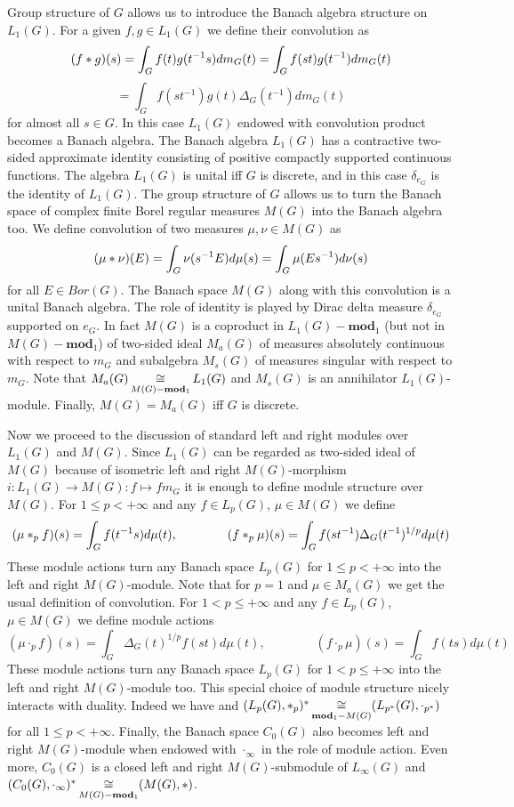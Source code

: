 Group structure of $G$ allows us to introduce the Banach algebra structure on $L_1(G)$. For a given $f,g\in L_1(G)$ we define their convolution as
$$
(f\ast g)(s)=\int_G f(t)g(t^{-1}s)dm_G(t)=\int_G f(st)g(t^{-1})dm_G(t)
$$
$$=\int_G f(st^{-1})g(t)\Delta_G(t^{-1})dm_G(t)
$$
for almost all $s\in G$. In this case $L_1(G)$ endowed with convolution product becomes a Banach algebra. The Banach algebra $L_1(G)$ has a contractive two-sided approximate identity consisting of positive compactly supported continuous functions. The algebra $L_1(G)$ is unital iff $G$ is discrete, and in this case $\delta_{e_G}$ is the identity of $L_1(G)$. The group structure of $G$ allows us to turn the Banach space of complex finite Borel regular measures $M(G)$ into the Banach algebra too. We define convolution of two measures $\mu,\nu\in M(G)$ as
$$
(\mu\ast \nu)(E)=\int_G\nu(s^{-1}E)d\mu(s)=\int_G\mu(Es^{-1})d\nu(s)
$$
for all $E\in Bor(G)$. The Banach space $M(G)$ along with this convolution is a unital Banach algebra. The role of identity is played by Dirac delta measure $\delta_{e_G}$ supported on $e_G$. In fact $M(G)$ is a coproduct in $L_1(G)-\mathbf{mod}_1$ (but not in $M(G)-\mathbf{mod}_1$) of two-sided ideal $M_a(G)$ of measures absolutely continuous with respect to $m_G$ and subalgebra $M_s(G)$ of measures singular with respect to $m_G$. Note that $M_a(G)\mathop{\mathbin{\cong}}\limits_{M(G)-\mathbf{mod}_1}L_1(G)$ and $M_s(G)$ is an annihilator $L_1(G)$-module. Finally, $M(G)=M_a(G)$ iff $G$ is discrete. 

Now we proceed to the discussion of standard left and right modules over $L_1(G)$ and $M(G)$. Since $L_1(G)$ can be regarded as two-sided ideal of $M(G)$ because of isometric left and right $M(G)$-morphism $i:L_1(G)\to M(G):f\mapsto f m_G$ it is enough to define module structure over $M(G)$. For $1\leq p<+\infty$ and any $f\in L_p(G)$, $\mu\in M(G)$ we define
$$
(\mu\ast_p f)(s)=\int_G f(t^{-1}s)d\mu(t),
\qquad\qquad
(f\ast_p \mu)(s)=\int_G f(st^{-1})\Delta_G(t^{-1})^{1/p}d\mu(t)
$$
These module actions turn any Banach space $L_p(G)$ for $1\leq p<+\infty$ into the left and right $M(G)$-module. Note that for $p=1$ and $\mu\in M_a(G)$ we get the usual definition of convolution. For $1<p\leq +\infty$ and any $f\in L_p(G)$, $\mu\in M(G)$ we define module actions
$$
(\mu\cdot_p f)(s)=\int_G \Delta_G(t)^{1/p}f(st)d\mu(t),
\qquad\qquad
(f\cdot_p \mu)(s)=\int_G f(ts)d\mu(t)
$$
These module actions turn any Banach space $L_p(G)$ for $1<p\leq+\infty$ into the left and right $M(G)$-module too. This special choice of module structure nicely interacts with duality. Indeed we have and $(L_p(G),\ast_p)^*\mathop{\mathbin{\cong}}\limits_{\mathbf{mod}_1-M(G)}(L_{p^*}(G),\cdot_{p^*})$ for all $1\leq p<+\infty$. Finally, the Banach space $C_0(G)$ also becomes left and right $M(G)$-module when endowed with $\cdot_\infty$ in the role of module action. Even more, $C_0(G)$ is a closed left and right $M(G)$-submodule of $L_\infty(G)$ and $(C_0(G),\cdot_\infty)^*\mathop{\mathbin{\cong}}\limits_{M(G)-\mathbf{mod}_1}(M(G),\ast)$.

